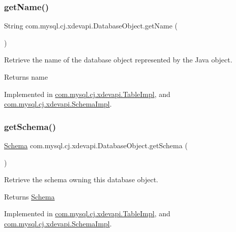 \subsubsection{\texorpdfstring{get\+Name()}{getName()}}
{\footnotesize\ttfamily String com.\+mysql.\+cj.\+xdevapi.\+Database\+Object.\+get\+Name (\begin{DoxyParamCaption}{ }\end{DoxyParamCaption})}

Retrieve the name of the database object represented by the Java object.

\begin{DoxyReturn}{Returns}
name 
\end{DoxyReturn}


Implemented in \mbox{\hyperlink{classcom_1_1mysql_1_1cj_1_1xdevapi_1_1_table_impl_aeef36a88f386e5a6a7375315ab2af2c8}{com.\+mysql.\+cj.\+xdevapi.\+Table\+Impl}}, and \mbox{\hyperlink{classcom_1_1mysql_1_1cj_1_1xdevapi_1_1_schema_impl_aab6a1ee96f0abeacc922a36da272e50d}{com.\+mysql.\+cj.\+xdevapi.\+Schema\+Impl}}.

\mbox{\label{interfacecom_1_1mysql_1_1cj_1_1xdevapi_1_1_database_object_a2d3d1b87950c42ecbe557248c51c954b}} 
\subsubsection{\texorpdfstring{get\+Schema()}{getSchema()}}
{\footnotesize\ttfamily \mbox{\hyperlink{interfacecom_1_1mysql_1_1cj_1_1xdevapi_1_1_schema}{Schema}} com.\+mysql.\+cj.\+xdevapi.\+Database\+Object.\+get\+Schema (\begin{DoxyParamCaption}{ }\end{DoxyParamCaption})}

Retrieve the schema owning this database object.

\begin{DoxyReturn}{Returns}
\mbox{\hyperlink{interfacecom_1_1mysql_1_1cj_1_1xdevapi_1_1_schema}{Schema}} 
\end{DoxyReturn}


Implemented in \mbox{\hyperlink{classcom_1_1mysql_1_1cj_1_1xdevapi_1_1_table_impl_a8aac02838d6b25aeeaaa53c4a34f4bac}{com.\+mysql.\+cj.\+xdevapi.\+Table\+Impl}}, and \mbox{\hyperlink{classcom_1_1mysql_1_1cj_1_1xdevapi_1_1_schema_impl_aed68ad42cc9c13041185849537c8b791}{com.\+mysql.\+cj.\+xdevapi.\+Schema\+Impl}}.

